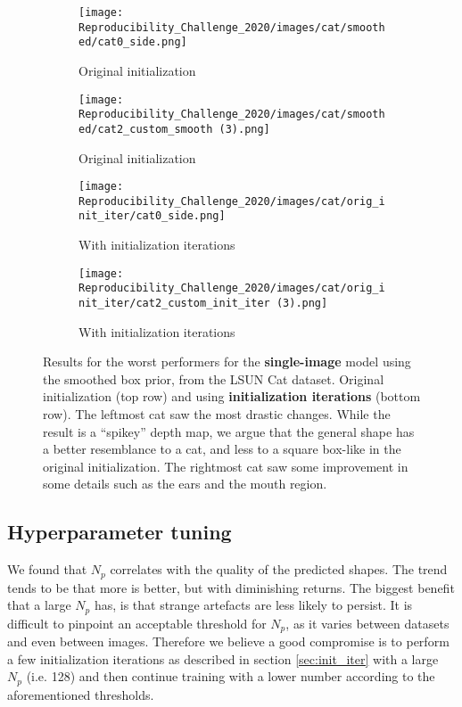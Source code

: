 \begin{figure}[!htb]
    \centering
    \begin{subfigure}{0.4\textwidth}
        \centering
        \texttt{[image: Reproducibility\_Challenge\_2020/images/cat/smoothed/cat0\_side.png]}
        \caption{Original initialization}
    \end{subfigure}
    \begin{subfigure}{0.4\textwidth}
        \centering
        \texttt{[image: Reproducibility\_Challenge\_2020/images/cat/smoothed/cat2\_custom\_smooth (3).png]}
        \caption{Original initialization}
    \end{subfigure}
    \begin{subfigure}{0.4\textwidth}
        \centering
        \texttt{[image: Reproducibility\_Challenge\_2020/images/cat/orig\_init\_iter/cat0\_side.png]}
        \caption{With initialization iterations}
    \end{subfigure}
    \begin{subfigure}{0.4\textwidth}
        \centering
        \texttt{[image: Reproducibility\_Challenge\_2020/images/cat/orig\_init\_iter/cat2\_custom\_init\_iter (3).png]}
        \caption{With initialization iterations}
    \end{subfigure}
    \caption{Results for the worst performers for the \textbf{single-image} model using the smoothed box prior, from the LSUN Cat dataset. Original initialization (top row) and using \textbf{initialization iterations} (bottom row). The leftmost cat saw the most drastic changes. While the result is a ``spikey'' depth map, we argue that the general shape has a better resemblance to a cat, and less to a square box-like in the original initialization. The rightmost cat saw some improvement in some details such as the ears and the mouth region.}
    \label{fig:init_iter_single}
\end{figure}




\subsection{Hyperparameter tuning}
\label{sec:appendix-hyperparams-tuning}
We found that $N_p$ correlates with the quality of the predicted shapes. The trend tends to be that more is better, but with diminishing returns. The biggest benefit that a large $N_p$ has, is that strange artefacts are less likely to persist. It is difficult to pinpoint an acceptable threshold for $N_p$, as it varies between datasets and even between images.  Therefore we believe a good compromise is to perform a few initialization iterations as described in section \ref{sec:init_iter} with a large $N_p$ (i.e. 128) and then continue training with a lower number according to the aforementioned thresholds.

